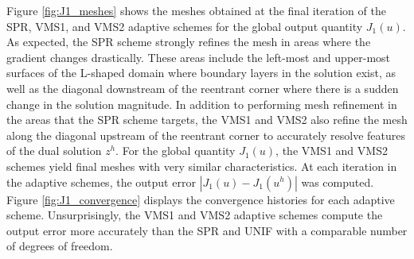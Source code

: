 Figure \ref{fig:J1_meshes} shows the meshes obtained at the
final iteration of the \textsc{SPR}, \textsc{VMS1}, and
\textsc{VMS2} adaptive schemes for the global output quantity
$J_1(u)$. As expected, the \textsc{SPR} scheme strongly refines
the mesh in areas where the gradient changes drastically.
These areas include the left-most and upper-most surfaces
of the L-shaped domain where boundary layers in the solution
exist, as well as the diagonal downstream of the
reentrant corner where there is a sudden change in the
solution magnitude. In addition to performing mesh refinement
in the areas that the \textsc{SPR} scheme targets, the
\textsc{VMS1} and \textsc{VMS2} also refine the mesh along
the diagonal upstream of the reentrant corner to accurately
resolve features of the dual solution $z^h$. For the global
quantity $J_1(u)$, the \textsc{VMS1} and \textsc{VMS2}
schemes yield final meshes with very similar characteristics.
At each iteration in the adaptive schemes, the
output error $|J_1(u) - J_1(u^h)|$ was computed.
Figure \ref{fig:J1_convergence} displays the convergence
histories for each adaptive scheme. Unsurprisingly,
the \textsc{VMS1} and \textsc{VMS2} adaptive schemes
compute the output error more accurately than the
\textsc{SPR} and \textsc{UNIF} with a comparable number
of degrees of freedom.

